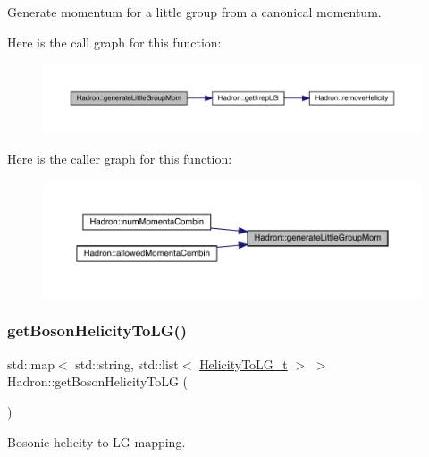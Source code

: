 Generate momentum for a little group from a canonical momentum. 

Here is the call graph for this function\+:
\nopagebreak
\begin{figure}[H]
\begin{center}
\leavevmode
\includegraphics[width=350pt]{d1/daf/namespaceHadron_a12d4f9d40cac2700ebb7a7420f20987b_cgraph}
\end{center}
\end{figure}
Here is the caller graph for this function\+:
\nopagebreak
\begin{figure}[H]
\begin{center}
\leavevmode
\includegraphics[width=350pt]{d1/daf/namespaceHadron_a12d4f9d40cac2700ebb7a7420f20987b_icgraph}
\end{center}
\end{figure}
\mbox{\label{namespaceHadron_a82bbcfd69a36dd0f63d6181069ff7393}} 
\subsubsection{\texorpdfstring{getBosonHelicityToLG()}{getBosonHelicityToLG()}}
{\footnotesize\ttfamily std\+::map$<$ std\+::string, std\+::list$<$ \mbox{\hyperlink{structHadron_1_1HelicityToLG__t}{Helicity\+To\+L\+G\+\_\+t}} $>$ $>$ Hadron\+::get\+Boson\+Helicity\+To\+LG (\begin{DoxyParamCaption}{ }\end{DoxyParamCaption})}



Bosonic helicity to LG mapping. 

